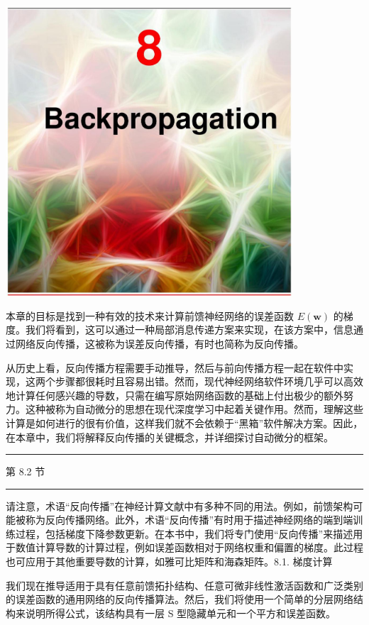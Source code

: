 \documentclass[10pt]{report}
\newcommand{\HRule}{\begin{center}\rule{0.9\linewidth}{0.2mm}\end{center}}
\begin{document}
\begin{center}
\includegraphics[max width=0.8\textwidth]{images/0194e279-9b28-703a-88f4-c3ac21e2010d_252_474_348_1074_1089_0.jpg}
\end{center}
\hspace*{3em} 

本章的目标是找到一种有效的技术来计算前馈神经网络的误差函数 \(E\left( \mathbf{w}\right)\) 的梯度。我们将看到，这可以通过一种局部消息传递方案来实现，在该方案中，信息通过网络反向传播，这被称为误差反向传播，有时也简称为反向传播。

从历史上看，反向传播方程需要手动推导，然后与前向传播方程一起在软件中实现，这两个步骤都很耗时且容易出错。然而，现代神经网络软件环境几乎可以高效地计算任何感兴趣的导数，只需在编写原始网络函数的基础上付出极少的额外努力。这种被称为自动微分的思想在现代深度学习中起着关键作用。然而，理解这些计算是如何进行的很有价值，这样我们就不会依赖于“黑箱”软件解决方案。因此，在本章中，我们将解释反向传播的关键概念，并详细探讨自动微分的框架。

\HRule

第 8.2 节

\HRule

请注意，术语“反向传播”在神经计算文献中有多种不同的用法。例如，前馈架构可能被称为反向传播网络。此外，术语“反向传播”有时用于描述神经网络的端到端训练过程，包括梯度下降参数更新。在本书中，我们将专门使用“反向传播”来描述用于数值计算导数的计算过程，例如误差函数相对于网络权重和偏置的梯度。此过程也可应用于其他重要导数的计算，如雅可比矩阵和海森矩阵。8.1. 梯度计算

我们现在推导适用于具有任意前馈拓扑结构、任意可微非线性激活函数和广泛类别的误差函数的通用网络的反向传播算法。然后，我们将使用一个简单的分层网络结构来说明所得公式，该结构具有一层 S 型隐藏单元和一个平方和误差函数。
\end{document}
